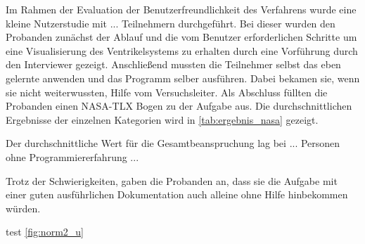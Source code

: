 Im Rahmen der Evaluation der Benutzerfreundlichkeit des Verfahrens wurde eine kleine Nutzerstudie mit ... Teilnehmern durchgeführt. Bei dieser wurden den Probanden zunächst der Ablauf und die vom Benutzer erforderlichen Schritte um eine Visualisierung des Ventrikelsystems zu erhalten durch eine Vorführung durch den Interviewer gezeigt. Anschließend mussten die Teilnehmer selbst das eben gelernte anwenden und das Programm selber ausführen. Dabei bekamen sie, wenn sie nicht weiterwussten, Hilfe vom Versuchsleiter. Als Abschluss füllten die Probanden einen NASA-TLX Bogen zu der Aufgabe aus. Die durchschnittlichen Ergebnisse der einzelnen Kategorien wird in \autoref{tab:ergebnis_nasa} gezeigt.


\begin{table}[h]
\centering
{}
\caption{Durchschnittlichen Ergebnisse des NASA-TLX Bogens}
\label{tab:ergebnis_nasa}
\end{table}


Der durchschnittliche Wert für die Gesamtbeanspruchung lag bei ... Personen ohne Programmiererfahrung ...

 
Trotz der Schwierigkeiten,  gaben die Probanden an, dass sie die Aufgabe mit einer guten ausführlichen Dokumentation auch alleine ohne Hilfe hinbekommen würden.


test \autoref{fig:norm2_u}



